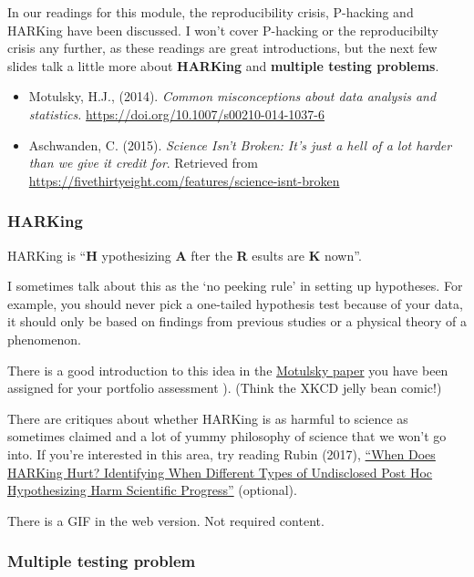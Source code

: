 \documentclass[
  openany]{book}
\providecommand{\tightlist}{%
  \setlength{\itemsep}{0pt}\setlength{\parskip}{0pt}}
\begin{document}
In our readings for this module, the reproducibility crisis, P-hacking and HARKing have been discussed. I won't cover P-hacking or the reproducibilty crisis any further, as these readings are great introductions, but the next few slides talk a little more about \textbf{HARKing} and \textbf{multiple testing problems}.

\begin{itemize}
\tightlist
\item
  Motulsky, H.J., (2014). \emph{Common misconceptions about data analysis and statistics.} \url{https://doi.org/10.1007/s00210-014-1037-6}
\item
  Aschwanden, C. (2015). \emph{Science Isn't Broken: It's just a hell of a lot harder than we give it credit for}. Retrieved from \url{https://fivethirtyeight.com/features/science-isnt-broken}
\end{itemize}

\hypertarget{harking}{%
\subsubsection{HARKing}\label{harking}}

HARKing is ``\textbf{H} ypothesizing \textbf{A} fter the \textbf{R} esults are \textbf{K} nown''.

I sometimes talk about this as the `no peeking rule' in setting up hypotheses. For example, you should never pick a one-tailed hypothesis test because of your data, it should only be based on findings from previous studies or a physical theory of a phenomenon.

There is a good introduction to this idea in the \href{https://link.springer.com/article/10.1007\%2Fs00210-014-1037-6}{Motulsky paper} you have been assigned for your portfolio assessment ). (Think the XKCD jelly bean comic!)

There are critiques about whether HARKing is as harmful to science as sometimes claimed and a lot of yummy philosophy of science that we won't go into. If you're interested in this area, try reading Rubin (2017), \href{https://journals.sagepub.com/doi/10.1037/gpr0000128}{``When Does HARKing Hurt? Identifying When Different Types of Undisclosed Post Hoc Hypothesizing Harm Scientific Progress''} (optional).

There is a GIF in the web version. Not required content.

\hypertarget{multiple-testing-problem}{%
\subsubsection{Multiple testing problem}\label{multiple-testing-problem}}
\end{document}
